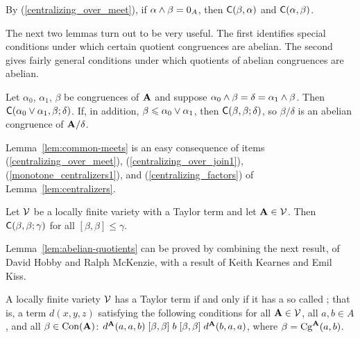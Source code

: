 \begin{rem}
By (\ref{centralizing_over_meet}), 
if $\alpha \wedge \beta = 0_{A}$,  
then $\mathsf{C}(\beta, \alpha)$ and $\mathsf{C}(\alpha, \beta)$.
\end{rem}

The next two lemmas turn out to be very useful.
The first identifies special conditions
under which certain quotient congruences are abelian.
The second gives fairly general conditions under which
quotients of abelian congruences are abelian.
\begin{lem}
  \label{lem:common-meets}
  Let $\alpha_0$, $\alpha_1$, $\beta$ be congruences of $\mathbf{A}$ and suppose 
  $\alpha_0 \wedge \beta = \delta = \alpha_1 \wedge \beta$.
  Then $\mathsf{C}(\alpha_0 \vee \alpha_1,  \beta;  \delta)$.  If, in addition, 
  $\beta \leqslant \alpha_0 \vee \alpha_1$, then 
  $\mathsf{C}(\beta,  \beta;  \delta)$, so $\beta/\delta$ is an 
  abelian congruence of $\mathbf{A}/\delta$.
\end{lem}
Lemma~\ref{lem:common-meets}
is an easy consequence
of items (\ref{centralizing_over_meet}), (\ref{centralizing_over_join1}),
(\ref{monotone_centralizers1}), and (\ref{centralizing_factors}) of
  Lemma~\ref{lem:centralizers}.
\begin{lem}
  \label{lem:abelian-quotients}
  Let $\mathcal{V}$ be a locally finite variety with a Taylor term and let $\mathbf{A}\in \mathcal{V}$.
  Then $\mathsf{C}(\beta, \beta; \gamma)$ for all $[\beta, \beta] \leq \gamma$.
\end{lem}
Lemma~\ref{lem:abelian-quotients} can be proved  by combining  
the next result, of David Hobby and Ralph McKenzie,
with a result of Keith Kearnes and Emil Kiss.
\begin{lem}
  \label{lem:HM-thm-7-12}
  A locally finite variety $\mathcal{V}$ has a Taylor term if and only if it has a
  so called ; that is, a term $d(x,y,z)$ satisfying
  the following conditions for all $\mathbf{A} \in \mathcal{V}$, all $a, b \in A$, and all
  $\beta \in \operatorname{Con} (\mathbf{A})$: 
  $d^{\mathbf{A}}(a,a,b) \mathrel{[\beta, \beta]} b \mathrel{[\beta, \beta]} d^{\mathbf{A}}(b,a,a)$,
  where $\beta = \operatorname{Cg}^{\mathbf{A}}(a,b)$.
\end{lem}

